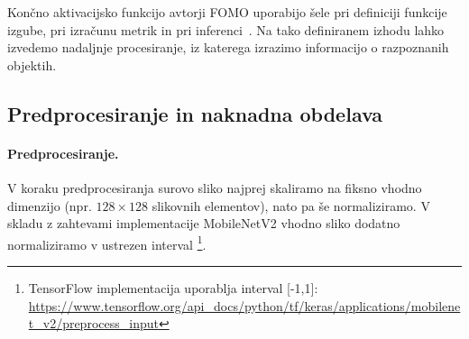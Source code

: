 \documentclass[a4paper,twoside,openright,12pt,slovene]{book}
\begin{document}
            Končno aktivacijsko funkcijo avtorji FOMO uporabijo šele pri definiciji funkcije izgube, pri izračunu metrik in pri inferenci~\cite{src:fomodocs, src:announcingfomo}. Na tako definiranem izhodu lahko izvedemo nadaljnje procesiranje, iz katerega izrazimo informacijo o razpoznanih objektih.

        \subsection{Predprocesiranje in naknadna obdelava} \label{sct:metodologija-fomo-processing}

            \paragraph{Predprocesiranje.}
            V koraku predprocesiranja surovo sliko najprej skaliramo na fiksno vhodno dimenzijo (npr. $128\times128$ slikovnih elementov), nato pa še normaliziramo. V skladu z zahtevami implementacije MobileNetV2 vhodno sliko dodatno normaliziramo v ustrezen interval \footnote{TensorFlow implementacija uporablja interval [-1,1]: \url{https://www.tensorflow.org/api_docs/python/tf/keras/applications/mobilenet_v2/preprocess_input}}.
            
\end{document}
